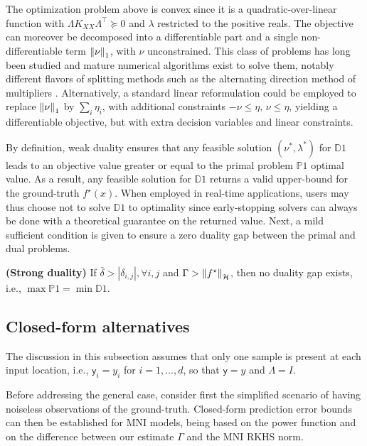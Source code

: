The optimization problem above is convex since it is a quadratic-over-linear function with $\Lambda K_{XX} \Lambda^\top \succeq 0$ and $\lambda$ restricted to the positive reals. The objective can moreover be decomposed into a differentiable part and a single non-differentiable term $\left\| \nu \right\|_1$, with $\nu$ unconstrained. This class of problems has long been studied and mature numerical algorithms exist to solve them, notably different flavors of splitting methods such as the alternating direction method of multipliers \cite[§6]{boyd2011distributed}. Alternatively, a standard linear reformulation could be employed to replace $\left\| \nu \right\|_1$ by $\sum_i \eta_i$, with additional constraints $-\nu \leq \eta, \, \nu \leq \eta$, yielding a differentiable objective, but with extra decision variables and linear constraints. 

By definition, weak duality \citep[§5]{bertsekas2009convex} ensures that any feasible solution $(\nu^*,\lambda^*)$ for $\mathds{D}1$ leads to an objective value greater or equal to the primal problem $\mathds{P}1$ optimal value. As a result, any feasible solution for $\mathds{D}1$ returns a valid upper-bound for the ground-truth  $f^\star(x)$. When employed in real-time applications, users may thus choose not to solve $\mathds{D}1$ to optimality since early-stopping solvers can always be done with a theoretical guarantee on the returned value. Next, a mild sufficient condition is given to ensure a zero duality gap between the primal and dual problems.

\begin{proposition}
	\label{prop.strong_duality}
	{\normalfont \textbf{(Strong duality)}}
	If $\bar \delta > |\delta_{i,j}|, \forall i, j$ and $\Gamma > \left\| f^\star \right\|_\mathcal{H}$, then no duality gap exists, i.e., $\max \mathds{P}1 = \min \mathds{D}1$.
\end{proposition}


\subsection{Closed-form alternatives}

The discussion in this subsection assumes that only one sample is present at each input location, i.e., $\mathsf{y}_i = y_i$ for $i=1,\dots,d $, so that $\mathsf{y}=y$ and $\Lambda = I$.

Before addressing the general case, consider first the simplified scenario of having noiseless observations of the ground-truth. Closed-form prediction error bounds can then be established for MNI models, being based on the power function and on the  difference between our estimate $\Gamma$ and the MNI RKHS norm.

